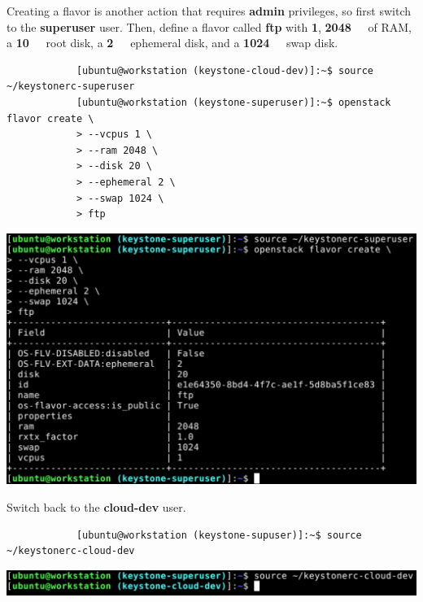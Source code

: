 \documentclass[letterpaper, 12pt]{article}
\begin{document}
\begin{enumerate}
    \begin{labstep}
        Creating a flavor is another action that requires \textbf{admin} privileges, so first switch to the \textbf{superuser} user.
        Then, define a flavor called \textbf{ftp} with \textbf{\qty{1}{\vcpu}}, \textbf{\qty{2048}{\mega\byte}} of RAM, a \textbf{\qty{10}{\giga\byte}} root disk, a \textbf{\qty{2}{\giga\byte}} ephemeral disk, and a \textbf{\qty{1024}{\mega\byte}} swap disk.
        \begin{lstlisting}
            [ubuntu@workstation (keystone-cloud-dev)]:~$ source ~/keystonerc-superuser
            [ubuntu@workstation (keystone-superuser)]:~$ openstack flavor create \
            > --vcpus 1 \
            > --ram 2048 \
            > --disk 20 \
            > --ephemeral 2 \
            > --swap 1024 \
            > ftp
        \end{lstlisting}

        \begin{center}
            \includegraphics[width=\linewidth]{images/part1/step40.png}
        \end{center}
    \end{labstep}

    \begin{labstep}
        Switch back to the \textbf{cloud-dev} user.
        \begin{lstlisting}
            [ubuntu@workstation (keystone-supuser)]:~$ source ~/keystonerc-cloud-dev
        \end{lstlisting}

        \begin{center}
            \includegraphics[width=\linewidth]{images/part1/step41.png}
        \end{center}
    \end{labstep}


\end{enumerate}
\end{document}
